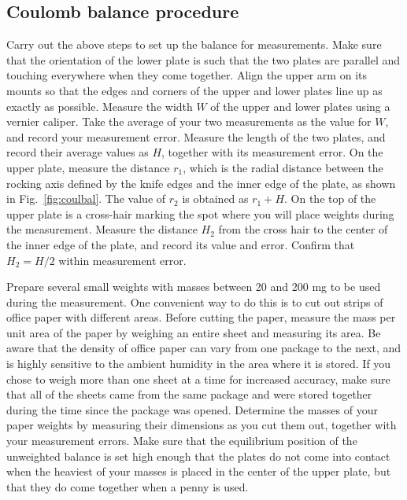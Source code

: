 \documentclass{revtex4}
\begin{document}
\subsection{Coulomb balance procedure}

Carry out the above steps to set up the balance for measurements.  Make
sure that the orientation of the lower plate is such that the two plates
are parallel and touching everywhere when they come together.  Align the
upper arm on its mounts so that the edges and corners of the upper and lower
plates line up as exactly as possible.  Measure the width $W$ of the upper
and lower plates using a vernier caliper.  Take the average of your two
measurements as the value for $W$, and record your measurement error.
Measure the length of the two plates, and record their average values as
$H$, together with its measurement error. On the upper plate, measure the
distance $r_1$, which is the radial distance between the rocking axis defined
by the knife edges and the inner edge of the plate, as shown in 
Fig.~\ref{fig:coulbal}.  The value of $r_2$ is obtained as $r_1+H$.
On the top of the upper plate is a cross-hair marking the spot where you
will place weights during the measurement.  Measure the distance $H_2$
from the cross hair to the center of the inner edge of the plate, and
record its value and error.  Confirm that $H_2 = H/2$ within measurement
error.

Prepare several small weights with masses between 20 and 200 mg to be used
during the measurement.  One convenient way to do this is to cut out strips
of office paper with different areas.  Before cutting the paper, measure the
mass per unit area of the paper by weighing an entire sheet and measuring its
area.  Be aware that the density of office paper can vary from one package to
the next, and is highly sensitive to the ambient humidity in the area where
it is stored.  If you chose to weigh more than one sheet at a time for
increased accuracy, make sure that all of the sheets came from the same
package and were stored together during the time since the package was
opened.  Determine the masses of your paper weights by measuring their
dimensions as you cut them out, together with your measurement errors.
Make sure that the equilibrium position of the unweighted balance is set
high enough that the plates do not come into contact when the heaviest of
your masses is placed in the center of the upper plate, but that they do
come together when a penny is used.
\end{document}
